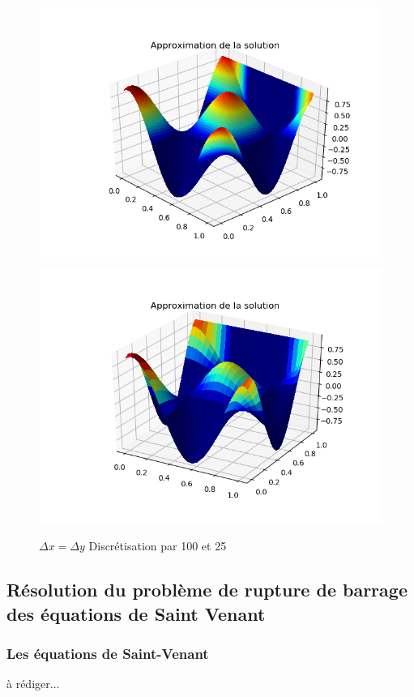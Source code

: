 \documentclass[12pt]{article}
\begin{document}
\\\begin{figure}[H]
	\centering
	\includegraphics[scale=0.5]{Approximation_de_la_solution.png}
		\includegraphics[scale=0.5]{Approximation_de_la_solution-1_discretisation25.png}
	\caption{$\Delta x=\Delta y$ Discrétisation par 100 et 25}
	\label{1D}
	\end{figure}

\subsection{Résolution du problème de rupture de barrage des équations de Saint Venant}
\subsubsection{Les équations de Saint-Venant}
à rédiger...
\end{document}
